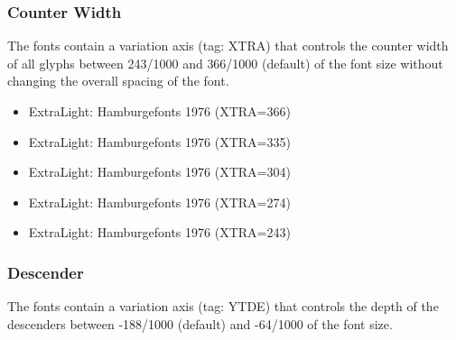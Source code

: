 \subsubsection{Counter Width}

The fonts contain a variation axis (tag: XTRA) that controls the counter width of all glyphs between {243/1000} and {366/1000} (default) of the font size without changing the overall spacing of the font.

\def\xtra{Hamburgefonts 1976}
\begin{itemize}
	\item { ExtraLight: \xtra{} (XTRA=366)}
	\item { ExtraLight: \xtra{} (XTRA=335)}
	\item { ExtraLight: \xtra{} (XTRA=304)}
	\item { ExtraLight: \xtra{} (XTRA=274)}
	\item { ExtraLight: \xtra{} (XTRA=243)}
\end{itemize}

\subsubsection{Descender}

The fonts contain a variation axis (tag: YTDE) that controls the depth of the descenders between {-188/1000} (default) and {-64/1000} of the font size.

